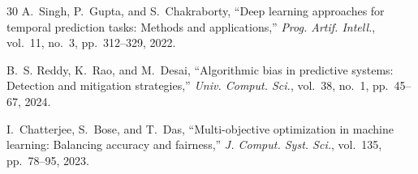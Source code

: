 \documentclass{svproc}
\begin{document}
\begin{thebibliography}{30}
A.~Singh, P.~Gupta, and S.~Chakraborty, ``Deep learning approaches for temporal prediction tasks: Methods and applications,'' \textit{Prog. Artif. Intell.}, vol.~11, no.~3, pp.~312--329, 2022.

B.~S. Reddy, K.~Rao, and M.~Desai, ``Algorithmic bias in predictive systems: Detection and mitigation strategies,'' \textit{Univ. Comput. Sci.}, vol.~38, no.~1, pp.~45--67, 2024.

I.~Chatterjee, S.~Bose, and T.~Das, ``Multi-objective optimization in machine learning: Balancing accuracy and fairness,'' \textit{J. Comput. Syst. Sci.}, vol.~135, pp.~78--95, 2023.

\end{thebibliography}
\end{document}
